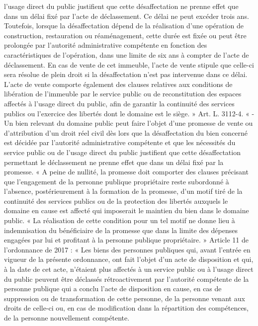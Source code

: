 \documentclass[11pt,a4paper]{report}
\begin{document}
l'usage direct du public justifient que cette désaffectation ne prenne effet que dans un délai fixé par l'acte de
déclassement. Ce délai ne peut excéder trois ans. Toutefois, lorsque la désaffectation dépend de la réalisation
d'une opération de construction, restauration ou réaménagement, cette durée est fixée ou peut être prolongée
par l'autorité administrative compétente en fonction des caractéristiques de l'opération, dans une limite de six
ans à compter de l'acte de déclassement. En cas de vente de cet immeuble, l'acte de vente stipule que celle-ci
sera résolue de plein droit si la désaffectation n'est pas intervenue dans ce délai. L'acte de vente comporte
également des clauses relatives aux conditions de libération de l'immeuble par le service public ou de
reconstitution des espaces affectés à l'usage direct du public, afin de garantir la continuité des services publics
ou l'exercice des libertés dont le domaine est le siège. »
Art. L. 3112-4. « -Un bien relevant du domaine public peut faire l'objet d'une promesse de vente ou
d'attribution d'un droit réel civil dès lors que la désaffectation du bien concerné est décidée par l'autorité
administrative compétente et que les nécessités du service public ou de l'usage direct du public justifient que
cette désaffectation permettant le déclassement ne prenne effet que dans un délai fixé par la promesse.
« A peine de nullité, la promesse doit comporter des clauses précisant que l'engagement de la personne publique
propriétaire reste subordonné à l'absence, postérieurement à la formation de la promesse, d'un motif tiré de la
continuité des services publics ou de la protection des libertés auxquels le domaine en cause est affecté qui
imposerait le maintien du bien dans le domaine public.
« La réalisation de cette condition pour un tel motif ne donne lieu à indemnisation du bénéficiaire de la
promesse que dans la limite des dépenses engagées par lui et profitant à la personne publique propriétaire. »
Article 11 de l’ordonnance de 2017 : « Les biens des personnes publiques qui, avant l'entrée en vigueur de la
présente ordonnance, ont fait l'objet d'un acte de disposition et qui, à la date de cet acte, n'étaient plus affectés à
un service public ou à l'usage direct du public peuvent être déclassés rétroactivement par l'autorité compétente
de la personne publique qui a conclu l'acte de disposition en cause, en cas de suppression ou de transformation
de cette personne, de la personne venant aux droits de celle-ci ou, en cas de modification dans la répartition des
compétences, de la personne nouvellement compétente.
\end{document}
